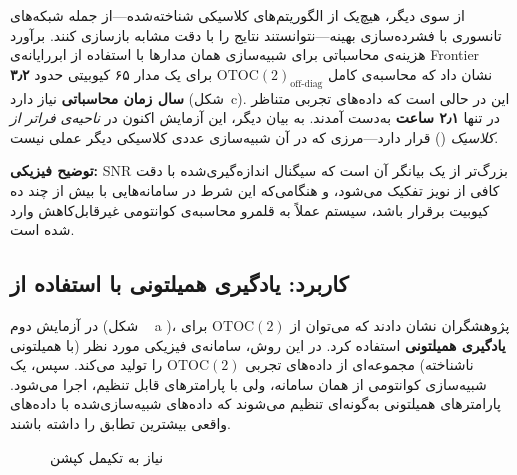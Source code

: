 از سوی دیگر، هیچ‌یک از الگوریتم‌های کلاسیکی شناخته‌شده—از جمله شبکه‌های تانسوری با فشرده‌سازی بهینه—نتوانستند نتایج را با دقت مشابه بازسازی کنند.  
برآورد هزینه‌ی محاسباتی برای شبیه‌سازی همان مدارها با استفاده از ابررایانه‌ی Frontier نشان داد که محاسبه‌ی کامل \(\mathrm{OTOC(2)}_{\text{off-diag}}\) برای یک مدار ۶۵ کیوبیتی حدود \textbf{۳٫۲ سال زمان محاسباتی} نیاز دارد (شکل~c\lr{\ref{fig4}}).  
این در حالی است که داده‌های تجربی متناظر در تنها \textbf{۲٫۱ ساعت} به‌دست آمدند.  
به بیان دیگر، این آزمایش اکنون در \textit{ناحیه‌ی فراتر از کلاسیک} () قرار دارد—مرزی که در آن شبیه‌سازی عددی کلاسیکی دیگر عملی نیست.

\textbf{توضیح فیزیکی:}  
SNR بزرگ‌تر از یک بیانگر آن است که سیگنال اندازه‌گیری‌شده با دقت کافی از نویز تفکیک می‌شود، و هنگامی‌که این شرط در سامانه‌هایی با بیش از چند ده کیوبیت برقرار باشد، سیستم عملاً به قلمرو محاسبه‌ی کوانتومی غیرقابل‌کاهش وارد شده است.

\subsection{کاربرد: یادگیری همیلتونی با استفاده از }

در آزمایش دوم (شکل ~ a \lr{\ref{fig5}})، پژوهشگران نشان دادند که می‌توان از \(\mathrm{OTOC(2)}\) برای \textbf{یادگیری همیلتونی} استفاده کرد.  
در این روش، سامانه‌ی فیزیکی مورد نظر (با همیلتونی ناشناخته) مجموعه‌ای از داده‌های تجربی \(\mathrm{OTOC(2)}\) را تولید می‌کند.  
سپس، یک شبیه‌سازی کوانتومی از همان سامانه، ولی با پارامترهای قابل تنظیم، اجرا می‌شود.  
پارامترهای همیلتونی به‌گونه‌ای تنظیم می‌شوند که داده‌های شبیه‌سازی‌شده با داده‌های واقعی بیشترین تطابق را داشته باشند.

\begin{figure}[htbp]
	\centering
	\caption{نیاز به تکیمل کپشن }
	\label{fig5}
\end{figure}


